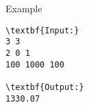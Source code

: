 Example
\begin{verbatim}
\textbf{Input:}
3 3
2 0 1
100 1000 100

\textbf{Output:}
1330.07\end{verbatim}
